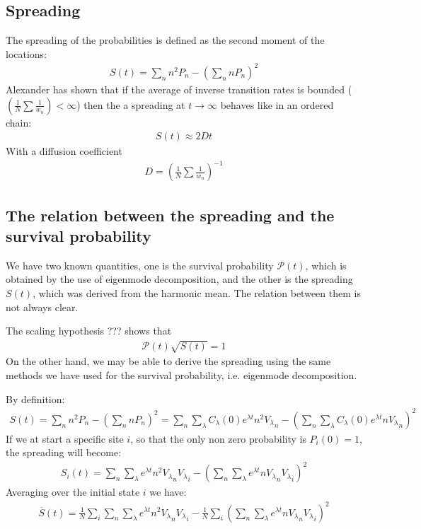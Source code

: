 \documentclass[onecolumn,fleqn]{revtex4}
\begin{document}
\subsection{Spreading}
The spreading of the probabilities is defined as the second moment of the locations:
\begin{align}
S(t) = \sum_n n^2 P_n -\left(\sum_n n P_n\right)^2
\end{align}
Alexander \cite{Alexander:1981:RMP} has shown that if the average of inverse transition rates is bounded ($\left(\frac{1}{N}\sum\frac{1}{w_n}\right) < \infty$) then the a spreading at $t\rightarrow \infty$ behaves like in an ordered chain:
\begin{align}
S(t) \approx 2Dt 
\end{align}
With a diffusion coefficient 
\begin{align}\label{eq:diff}
D = \left(\frac{1}{N}\sum\frac{1}{w_n}\right)^{-1}
\end{align}

\subsection{The relation between the spreading and the survival probability}
We have two known quantities, one is the survival probability $\mathcal{P}(t)$, which is obtained by the use of eigenmode decomposition, and the other is the spreading $S(t)$, which was derived from the harmonic mean. The relation between them is not always clear. 

The scaling hypothesis ??? shows that
\begin{align}
\mathcal{P}(t)\sqrt{S(t)}=1
\end{align}
On the other hand, we may be able to derive the spreading using the same methods we have used for the survival probability, i.e. eigenmode decomposition.

By definition:
\begin{align}
S(t) = \sum_n n^2 P_n -\left(\sum_n n P_n\right)^2 = \sum_n\sum_\lambda C_\lambda(0)e^{\lambda t}n^2 {V_\lambda}_n - (\sum_n\sum_\lambda C_\lambda(0)e^{\lambda t}n {V_\lambda}_n)^2
\end{align}
If we at start a specific site $i$, so that the only non zero probability is $P_i(0)=1$, the spreading will become:
\begin{align}
S_i(t) = \sum_n\sum_\lambda e^{\lambda t}n^2 {V_\lambda}_n{V_\lambda}_i - (\sum_n\sum_\lambda e^{\lambda t}n {V_\lambda}_n{V_\lambda}_i)^2
\end{align}
Averaging over the initial state $i$ we have:
\begin{align}
\overline{S}(t) = \frac{1}{N}\sum_i\sum_n\sum_\lambda e^{\lambda t}n^2 {V_\lambda}_n{V_\lambda}_i - \frac{1}{N}\sum_i(\sum_n\sum_\lambda e^{\lambda t}n {V_\lambda}_n{V_\lambda}_i)^2
\end{align}
\end{document}
